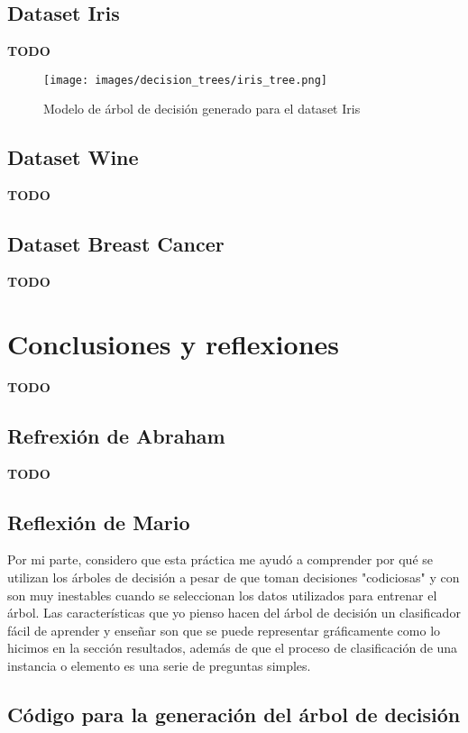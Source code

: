 \documentclass[sigconf,authorversion,nonacm]{acmart}
\begin{document}
\subsection{Dataset Iris}
\textbf{TODO}
\begin{figure}[H]
  \centering
  \texttt{[image: images/decision\_trees/iris\_tree.png]}
  \caption{Modelo de árbol de decisión generado para el dataset Iris}
\end{figure}

\subsection{Dataset Wine}
\textbf{TODO}

\subsection{Dataset Breast Cancer}
\textbf{TODO}


\section{Conclusiones y reflexiones}
\textbf{TODO}

\subsection{Refrexión de Abraham}
\textbf{TODO}

\subsection{Reflexión de Mario}
Por mi parte, considero que esta práctica me ayudó a comprender por qué se utilizan los árboles de decisión a pesar de que toman decisiones "codiciosas" y con son muy inestables cuando se seleccionan los datos utilizados para entrenar el árbol. Las características que yo pienso hacen del árbol de decisión un clasificador fácil de aprender y enseñar son que se puede representar gráficamente como lo hicimos en la sección resultados, además de que el proceso de clasificación de una instancia o elemento es una serie de preguntas simples.





\clearpage

\appendix

\lstset{style=customstyle}

\begin{figure*}
 \section{Código para la generación del árbol de decisión}
  \label{appendix:py}
  
\end{figure*}

\begin{figure*}
  
\end{figure*}
\end{document}
